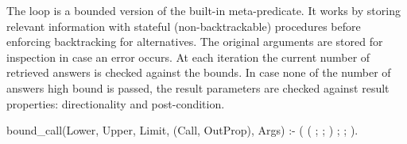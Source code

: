 The loop is a bounded version of the  built-in
meta-predicate.
%
It works by storing relevant information with stateful
(non-backtrackable) procedures before enforcing backtracking for
alternatives.
%
The original arguments are stored for inspection in case an error
occurs.
%
At each iteration the current number of retrieved answers is checked
against the bounds.
%
In case none of the number of answers high bound is passed, the result
parameters are checked against result properties: directionality and
post-condition.
\begin{yapcode}
 bound_call(Lower, Upper, Limit,
            (Call, OutProp), Args) :-
   (
    (
    ;
    ;
    )
   ;
   ;
   ).
\end{yapcode}

